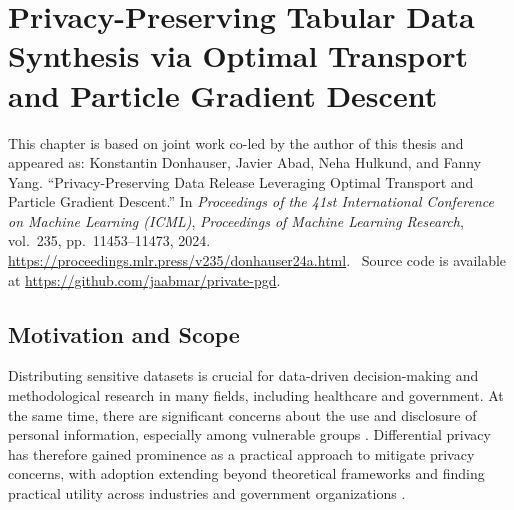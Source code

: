 \chapter{Privacy-Preserving Tabular Data Synthesis via Optimal Transport and Particle Gradient Descent}
\label{chap:privpgd}


\chapterpublication
  {This chapter is based on joint work co-led by the author of this thesis and appeared as:}
  {Konstantin Donhauser\equalcontributionmark, Javier Abad\equalcontributionmark, Neha Hulkund, and Fanny Yang. ``Privacy-Preserving Data Release Leveraging Optimal Transport and Particle Gradient Descent.'' In \emph{Proceedings of the 41st International Conference on Machine Learning (ICML)}, \emph{Proceedings of Machine Learning Research}, vol.~235, pp.~11453--11473, 2024. \url{https://proceedings.mlr.press/v235/donhauser24a.html}. \equalcontributionnote\ Source code is available at \url{https://github.com/jaabmar/private-pgd}.}

\vspace{-0.6\baselineskip}
\enlargethispage{\baselineskip}

\section{Motivation and Scope}

Distributing sensitive datasets is crucial for data-driven decision-making and methodological research in many fields, including healthcare and government. At the same time, there are significant concerns about the use and disclosure of personal information, especially among vulnerable groups \citep{el2011case}. Differential privacy has therefore gained prominence as a practical approach to mitigate privacy concerns, with adoption extending beyond theoretical frameworks and finding practical utility across industries and government organizations \citep{johnson2018towards,abowd2018us,aktay2020google}.

